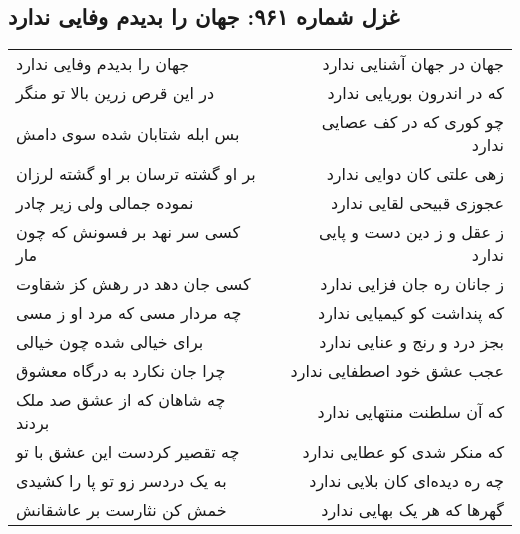 \begin{center}
\section*{غزل شماره ۹۶۱: جهان را بدیدم وفایی ندارد}
\label{sec:0961}
\begin{longtable}{l p{0.5cm} r}
جهان را بدیدم وفایی ندارد
&&
جهان در جهان آشنایی ندارد
\\
در این قرص زرین بالا تو منگر
&&
که در اندرون بوریایی ندارد
\\
بس ابله شتابان شده سوی دامش
&&
چو کوری که در کف عصایی ندارد
\\
بر او گشته ترسان بر او گشته لرزان
&&
زهی علتی کان دوایی ندارد
\\
نموده جمالی ولی زیر چادر
&&
عجوزی قبیحی لقایی ندارد
\\
کسی سر نهد بر فسونش که چون مار
&&
ز عقل و ز دین دست و پایی ندارد
\\
کسی جان دهد در رهش کز شقاوت
&&
ز جانان ره جان فزایی ندارد
\\
چه مردار مسی که مرد او ز مسی
&&
که پنداشت کو کیمیایی ندارد
\\
برای خیالی شده چون خیالی
&&
بجز درد و رنج و عنایی ندارد
\\
چرا جان نکارد به درگاه معشوق
&&
عجب عشق خود اصطفایی ندارد
\\
چه شاهان که از عشق صد ملک بردند
&&
که آن سلطنت منتهایی ندارد
\\
چه تقصیر کردست این عشق با تو
&&
که منکر شدی کو عطایی ندارد
\\
به یک دردسر زو تو پا را کشیدی
&&
چه ره دیده‌ای کان بلایی ندارد
\\
خمش کن نثارست بر عاشقانش
&&
گهرها که هر یک بهایی ندارد
\\
\end{longtable}
\end{center}
